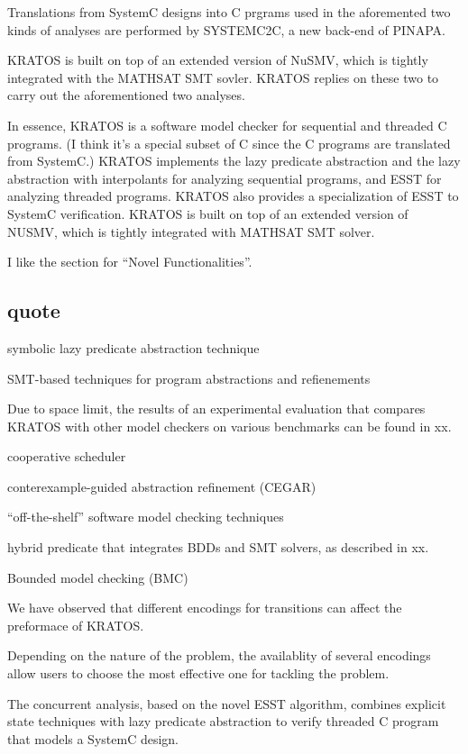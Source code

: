 \documentclass{llncs}
\newcommand{\kratos}{KRATOS}
\newcommand{\sysc}{SystemC}
\begin{document}
Translations from SystemC designs into C prgrams used in the aforemented two
kinds of analyses are performed by SYSTEMC2C, a new back-end of PINAPA.

\kratos{} is built on top of an extended version of NuSMV, which is tightly
integrated with the MATHSAT SMT sovler. \kratos{} replies on these two to carry
out the aforementioned two analyses.

In essence, \kratos{} is a software model checker for sequential and threaded C
programs. (I think it's a special subset of C since the C programs are
translated from \sysc{}.) \kratos{} implements the lazy predicate abstraction and the lazy
abstraction with interpolants for analyzing sequential programs, and ESST for
analyzing threaded programs. \kratos{} also provides a specialization of ESST to
\sysc{} verification. \kratos{} is built on top of an extended version of NUSMV,
which is tightly integrated with MATHSAT SMT solver.

I like the section for ``Novel Functionalities''.

\subsection{quote}
symbolic lazy predicate abstraction technique

SMT-based techniques for program abstractions and refienements

Due to space limit, the results of an experimental evaluation that compares
\kratos{} with other model checkers on various benchmarks can be found in xx.

cooperative scheduler

conterexample-guided abstraction refinement (CEGAR)

``off-the-shelf'' software model checking techniques

hybrid predicate that integrates BDDs and SMT solvers, as described in xx.

Bounded model checking (BMC)

We have observed that different encodings for transitions can affect the
preformace of \kratos{}.

Depending on the nature of the problem, the availablity of several encodings
allow users to choose the most effective one for tackling the problem.

The concurrent analysis, based on the novel ESST algorithm, combines explicit
state techniques with lazy predicate abstraction to verify threaded C program
that models a \sysc{} design.
\end{document}
